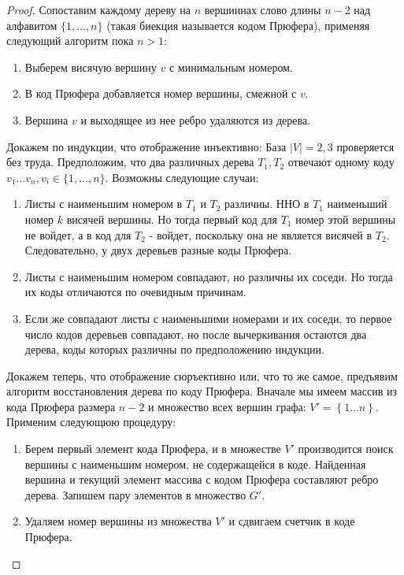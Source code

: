 \begin{proof}
	Сопоставим каждому дереву на $n$ вершиинах слово длины $n-2$ над алфавитом $\{1, \ldots, n\}$ (такая биекция называется кодом Прюфера), применяя следующий алгоритм пока $n > 1$:
	\begin{enumerate}
		\item Выберем висячую вершину $v$ с минимальным номером.
		\item В код Прюфера добавляется номер вершины, смежной с $v$.
		\item Вершина $v$ и выходящее из нее ребро удаляются из дерева.
	\end{enumerate}

	
	Докажем по индукции, что отображение инъективно:
	База $|V|=2,3$ проверяется без труда. Предположим, что два различных дерева $T_{1}, T_{2}$ отвечают одному коду $v_{1} \ldots v_{n}, v_{i} \in\{1, \ldots, n\} .$
	Возможны следующие случаи:
	
	\begin{enumerate}
		\item Листы с наименьшим номером в $T_{1}$ и $T_{2}$ различны. ННО в $T_1$ наименьший номер $k$ висячей вершины. Но тогда первый код для $T_1$ номер этой вершины не войдет, а в код для $T_2$ - войдет, поскольку она не является висячей в $T_2$. Следовательно, у двух деревьев разные коды Прюфера.
		\item Листы с наименьшим номером совпадают, но различны их соседи. Но тогда их коды отличаются по очевидным причинам.
		\item Если же совпадают листы с наименьшими номерами и их соседи, то первое число кодов деревьев совпадают, но после вычеркивания остаются два дерева, коды которых различны по предположению
		индукции.
	\end{enumerate}

	Докажем теперь, что отображение сюръективно или, что то же самое, предъявим алгоритм восстановления дерева по коду Прюфера.
	Вначале мы имеем массив из кода Прюфера размера $n-2$ и множество всех вершин графа: $ V' = \left\lbrace 1… n\right\rbrace $. Применим следующюю процедуру:
	
	 \begin{enumerate} 
	 	\item Берем первый элемент кода Прюфера, и в множестве $V'$ производится поиск вершины с наименьшим номером, не содержащейся в коде. Найденная вершина и текущий элемент массива с кодом Прюфера составляют ребро дерева. Запишем пару элементов в множество $G'$.
	 	\item Удаляем номер вершины из множества $V'$ и сдвигаем счетчик в коде Прюфера.
	\end{enumerate}


\end{proof}
